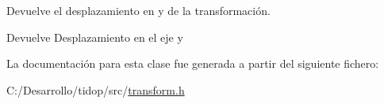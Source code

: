 Devuelve el desplazamiento en y de la transformación. 

\begin{DoxyReturn}{Devuelve}
Desplazamiento en el eje y 
\end{DoxyReturn}


La documentación para esta clase fue generada a partir del siguiente fichero\+:\begin{DoxyCompactItemize}
\item 
C\+:/\+Desarrollo/tidop/src/\hyperlink{transform_8h}{transform.\+h}\end{DoxyCompactItemize}
